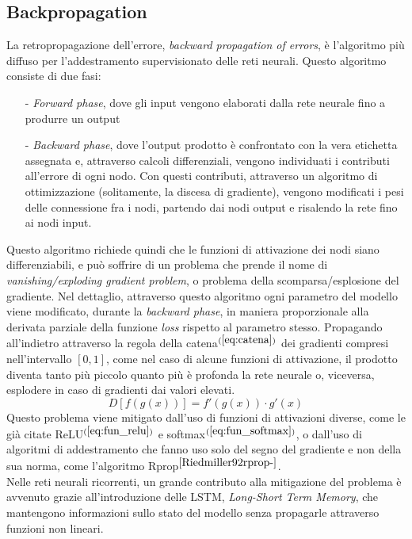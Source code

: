 \subsection*{Backpropagation} La retropropagazione dell'errore, \textit{backward propagation of errors}, è l'algoritmo più diffuso per l'addestramento supervisionato delle reti neurali. Questo algoritmo consiste di due fasi:
\begin{itemize}
    \item[-] \textit{Forward phase}, dove gli input vengono elaborati dalla rete neurale fino a produrre un output
    \item[-] \textit{Backward phase}, dove l'output prodotto è confrontato con la vera etichetta assegnata e, attraverso calcoli differenziali, vengono individuati i contributi all'errore di ogni nodo. Con questi contributi, attraverso un algoritmo di ottimizzazione (solitamente, la discesa di gradiente), vengono modificati i pesi delle connessione fra i nodi, partendo dai nodi output e risalendo la rete fino ai nodi input.
\end{itemize}
Questo algoritmo richiede quindi che le funzioni di attivazione dei nodi siano differenziabili, e può soffrire di un problema che prende il nome di \textit{vanishing/exploding gradient problem}, o problema della scomparsa/esplosione del gradiente. Nel dettaglio, attraverso questo algoritmo ogni parametro del modello viene modificato, durante la \textit{backward phase}, in maniera proporzionale alla derivata parziale della funzione \textit{loss} rispetto al parametro stesso. Propagando all'indietro attraverso la regola della catena$^{(\ref{eq:catena})}$ dei gradienti compresi nell'intervallo $[0, 1]$, come nel caso di alcune funzioni di attivazione, il prodotto diventa tanto più piccolo quanto più è profonda la rete neurale o, viceversa, esplodere in caso di gradienti dai valori elevati.
\begin{equation}\label{eq:catena}
D\left[f(g(x))\right] = f'(g(x))\cdot g'(x)
\end{equation}
Questo problema viene mitigato dall'uso di funzioni di attivazioni diverse, come le già citate ReLU$^{(\ref{eq:fun_relu})}$ e softmax$^{(\ref{eq:fun_softmax})}$, o dall'uso di algoritmi di addestramento che fanno uso solo del segno del gradiente e non della sua norma, come l'algoritmo Rprop$^{\cite{Riedmiller92rprop-}}$.\\
Nelle reti neurali ricorrenti, un grande contributo alla mitigazione del problema è avvenuto grazie all'introduzione delle LSTM, \textit{Long-Short Term Memory}, che mantengono informazioni sullo stato del modello senza propagarle attraverso funzioni non lineari.

